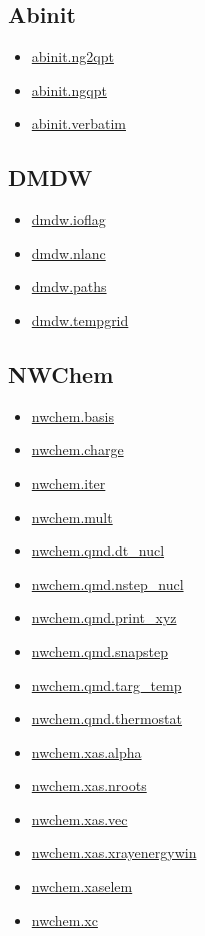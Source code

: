 \documentclass[11pt]{article}
\begin{document}
\subsection*{Abinit}
\begin{itemize}
\item \hyperref[kw:abinit-ng2qpt]{abinit.ng2qpt}
\item \hyperref[kw:abinit-ngqpt]{abinit.ngqpt}
\item \hyperref[kw:abinit-verbatim]{abinit.verbatim}
\end{itemize}

\subsection*{DMDW}
\begin{itemize}
\item \hyperref[kw:dmdw-ioflag]{dmdw.ioflag}
\item \hyperref[kw:dmdw-nlanc]{dmdw.nlanc}
\item \hyperref[kw:dmdw-paths]{dmdw.paths}
\item \hyperref[kw:dmdw-tempgrid]{dmdw.tempgrid}
\end{itemize}

\subsection*{NWChem}
\begin{itemize}
\item \hyperref[kw:nwchem-basis]{nwchem.basis}
\item \hyperref[kw:nwchem-charge]{nwchem.charge}
\item \hyperref[kw:nwchem-iter]{nwchem.iter}
\item \hyperref[kw:nwchem-mult]{nwchem.mult}
\item \hyperref[kw:nwchem-qmd-dt-nucl]{nwchem.qmd.dt\_nucl}
\item \hyperref[kw:nwchem-qmd-nstep-nucl]{nwchem.qmd.nstep\_nucl}
\item \hyperref[kw:nwchem-qmd-print-xyz]{nwchem.qmd.print\_xyz}
\item \hyperref[kw:nwchem-qmd-snapstep]{nwchem.qmd.snapstep}
\item \hyperref[kw:nwchem-qmd-targ-temp]{nwchem.qmd.targ\_temp}
\item \hyperref[kw:nwchem-qmd-thermostat]{nwchem.qmd.thermostat}
\item \hyperref[kw:nwchem-xas-alpha]{nwchem.xas.alpha}
\item \hyperref[kw:nwchem-xas-nroots]{nwchem.xas.nroots}
\item \hyperref[kw:nwchem-xas-vec]{nwchem.xas.vec}
\item \hyperref[kw:nwchem-xas-xrayenergywin]{nwchem.xas.xrayenergywin}
\item \hyperref[kw:nwchem-xaselem]{nwchem.xaselem}
\item \hyperref[kw:nwchem-xc]{nwchem.xc}
\end{itemize}
\end{document}
